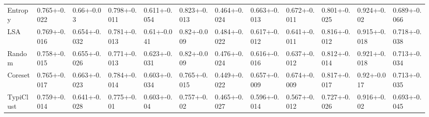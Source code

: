 \documentclass[]{article}
\begin{document}
\begin{table}[H]
{\begin{tabular}{l|lllllllllll}
		Entropy & 0.765+-0.022 & 0.66+-0.03 & 0.798+-0.011 & 0.611+-0.054 & 0.823+-0.013 & 0.464+-0.024 & 0.663+-0.013 & 0.672+-0.011 & 0.801+-0.025 & 0.924+-0.02 & 0.689+-0.066 \\
		LSA & 0.769+-0.016 & 0.654+-0.032 & 0.781+-0.013 & 0.61+-0.041 & 0.82+-0.009 & 0.484+-0.022 & 0.617+-0.012 & 0.641+-0.011 & 0.816+-0.012 & 0.915+-0.018 & 0.718+-0.038 \\
		Random & 0.758+-0.015 & 0.655+-0.026 & 0.771+-0.013 & 0.623+-0.031 & 0.82+-0.009 & 0.476+-0.024 & 0.616+-0.016 & 0.637+-0.012 & 0.812+-0.014 & 0.921+-0.018 & 0.713+-0.034 \\
		Coreset & 0.765+-0.017 & 0.663+-0.023 & 0.784+-0.014 & 0.603+-0.034 & 0.765+-0.015 & 0.449+-0.022 & 0.657+-0.009 & 0.674+-0.009 & 0.817+-0.017 & 0.92+-0.017 & 0.713+-0.035 \\
		TypiClust & 0.759+-0.014 & 0.641+-0.028 & 0.775+-0.01 & 0.603+-0.04 & 0.757+-0.02 & 0.465+-0.027 & 0.596+-0.014 & 0.567+-0.012 & 0.727+-0.026 & 0.916+-0.02 & 0.693+-0.045
	\end{tabular}
}
\end{table}
\end{document}
